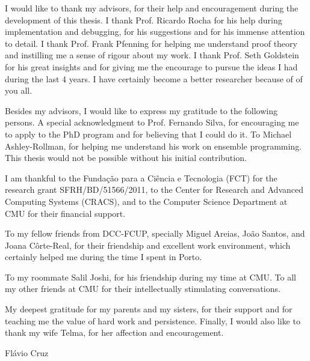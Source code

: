 I would like to thank my advisors, for their help and encouragement during the
development of this thesis. I thank Prof. Ricardo Rocha for his help during
implementation and debugging, for his suggestions and for his immense attention
to detail. I thank Prof. Frank Pfenning for helping me understand proof theory
and instilling me a sense of rigour about my work. I thank Prof. Seth Goldstein
for his great insights and for giving me the encourage to pursue the ideas I
had during the last 4 years. I have certainly become a better researcher
because of of you all.

Besides my advisors, I would like to express my gratitude to the following
persons. A special acknowledgment to Prof. Fernando Silva, for encouraging me
to apply to the PhD program and for believing that I could do it.  To Michael
Ashley-Rollman, for helping me understand his work on ensemble programming.
This thesis would not be possible without his initial contribution.

I am thankful to the Fundação para a Ciência e Tecnologia (FCT) for the
research grant SFRH/BD/51566/2011, to the Center for Research and Advanced
Computing Systems (CRACS), and to the Computer Science Department at CMU for
their financial support.

To my fellow friends from DCC-FCUP, specially Miguel Areias, João Santos, and
Joana Côrte-Real, for their friendship and excellent work environment, which
certainly helped me during the time I spent in Porto.

To my roommate Salil Joshi, for his friendship during my time at CMU. To all my
other friends at CMU for their intellectually stimulating conversations.

My deepest gratitude for my parents and my sisters, for their support and for
teaching me the value of hard work and persistence. Finally, I would also like
to thank my wife Telma, for her affection and encouragement.

\vspace{-0.5cm}
\begin{flushright}
Flávio Cruz \\
\end{flushright}
